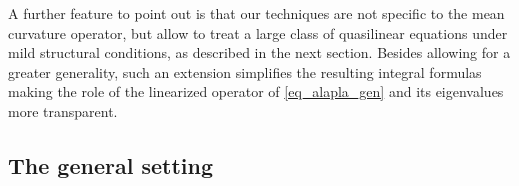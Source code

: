 \documentclass[10 pt,a4paper]{article}
\newtheorem{theorem}[definition]{Theorem}
\theoremstyle{definition}
\begin{document}
A further feature to point out is that our techniques are not specific to the mean curvature operator, but allow to treat a large class of quasilinear equations under mild structural conditions, as described in the next section. Besides allowing for a greater generality, such an extension simplifies the resulting integral formulas making the role of the linearized operator of \eqref{eq_alapla_gen} and its eigenvalues more transparent.
%
%
%
%	
%


\subsection{The general setting}
\end{document}
